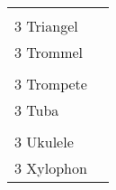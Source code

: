 \documentclass{article}\usepackage[ngerman]{babel}\usepackage{geometry}\usepackage{lmodern}
\begin{document}
\begin{table}[p]
  \begin{tabular}{ll}    \hspace{-2em}    \fbox{\begin{minipage}[t][6cm][t]{8cm}
        \fontsize{45}{54} \selectfont
        \phantom{ }\\
      \phantom{ }3 Triangel    \end{minipage}}
    &
\fbox{\begin{minipage}[t][6cm][t]{8cm}
        \fontsize{45}{54} \selectfont
        \phantom{ }\\
        \phantom{ } 3 Trommel      \end{minipage}}\\    \hspace{-2em}    \fbox{\begin{minipage}[t][6cm][t]{8cm}
        \fontsize{45}{54} \selectfont
        \phantom{ }\\
      \phantom{ }3 Trompete    \end{minipage}}
    &
\fbox{\begin{minipage}[t][6cm][t]{8cm}
        \fontsize{45}{54} \selectfont
        \phantom{ }\\
        \phantom{ } 3 Tuba      \end{minipage}}\\    \hspace{-2em}    \fbox{\begin{minipage}[t][6cm][t]{8cm}
        \fontsize{45}{54} \selectfont
        \phantom{ }\\
      \phantom{ }3 Ukulele    \end{minipage}}
    &
\fbox{\begin{minipage}[t][6cm][t]{8cm}
        \fontsize{45}{54} \selectfont
        \phantom{ }\\
        \phantom{ } 3 Xylophon       \end{minipage}}\\\end{tabular}
\end{table}
\end{document}
